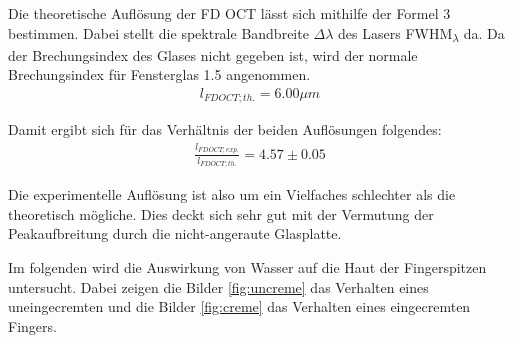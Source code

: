 \documentclass[german, %
parskip=full, %
bibliography=totoc, %
]{scrartcl}
\begin{document}
Die theoretische Auflösung der FD OCT lässt sich mithilfe der Formel 3 bestimmen. Dabei stellt die spektrale Bandbreite $\Delta \lambda$ des Lasers FWHM\textsubscript{$\lambda$} da. Da der Brechungsindex des Glases nicht gegeben ist, wird der normale Brechungsindex für Fensterglas 1.5 angenommen. 
\begin{align*}
l_{FD OCT; th.} = 6.00 \mu m
\end{align*}

Damit ergibt sich für das Verhältnis der beiden Auflösungen folgendes:
\begin{align*}
\frac{l_{FD OCT; exp.}}{l_{FD OCT; th.}} = 4.57 \pm 0.05
\end{align*}

Die experimentelle Auflösung ist also um ein Vielfaches schlechter als die theoretisch mögliche. Dies deckt sich sehr gut mit der Vermutung der Peakaufbreitung durch die nicht-angeraute Glasplatte. 

Im folgenden wird die Auswirkung von Wasser auf die Haut der Fingerspitzen untersucht. Dabei zeigen die Bilder \ref{fig:uncreme} das Verhalten eines uneingecremten und die Bilder \ref{fig:creme} das Verhalten eines eingecremten Fingers. 
\end{document}
